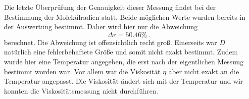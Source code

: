Die letzte Überprüfung der Genauigkeit dieser Messung findet bei der Bestimmung der Molekülradien statt.
Beide möglichen Werte wurden bereits in der Auswertung bestimmt. 
Daher wird hier nur die Abweichung 
\begin{equation}
    \Delta r = \num{50.46} \% \, .
\end{equation}
berechnet.
Die Abweichung ist offensichtlich recht groß.
Einerseits war $D$ natürlich eine fehlerbehaftete Größe und somit nicht exakt bestimmt.
Zudem wurde hier eine Temperatur angegeben, die erst nach der eigentlichen Messung bestimmt worden war.
Vor allem war die Viskosität $\eta$ aber nicht exakt an die Temperatur angepasst. 
Die Viskosität ändert sich mit der Temperatur und wir konnten die Viskositätsmessung nicht durchführen.